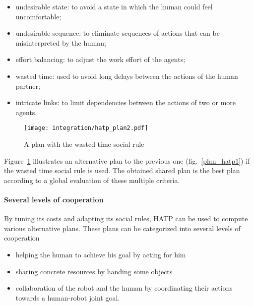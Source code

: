 \begin{itemize}

    \item undesirable state: to avoid a state in which the human could feel
    uncomfortable;

    \item undesirable sequence: to eliminate sequences of actions that can be
    misinterpreted by the human;

    \item effort balancing: to adjust the work effort of the agents;

    \item wasted time: used to avoid long delays between the actions of the
    human partner;

    \item intricate links: to limit dependencies between the actions of two or
    more agents.

\end{itemize}

\begin{figure}[htbp]
  \centering
  \texttt{[image: integration/hatp\_plan2.pdf]}
  \caption{A plan with the wasted time social rule}
  \label{plan_hatp2}
\end{figure}

Figure~\ref{plan_hatp2} illustrates an alternative plan to the previous one
(fig.~\ref{plan_hatp1}) if the wasted time social rule is used.  The obtained
shared plan is the best plan according to a global evaluation of these multiple
criteria.

\paragraph{Several levels of cooperation} By tuning its costs and adapting its
social rules, HATP can be used to compute various alternative plans. These
plans can be categorized into several levels of cooperation

\begin{itemize}

    \item helping the human to achieve his goal by acting for him

    \item sharing concrete resources by handing some objects

    \item collaboration of the robot and the human by coordinating their
    actions towards a human-robot joint goal.

\end{itemize}


